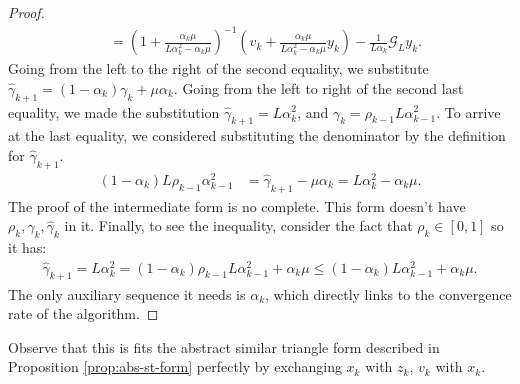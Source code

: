 \documentclass[12pt]{article}
\begin{document}
\begin{proof}
\begin{align*}
                &= 
                \left(
                    1 + \frac{\alpha_k \mu}{L \alpha_k^2 - \alpha_k \mu}
                \right)^{-1}
                \left(
                    v_k + 
                    \frac{\alpha_k \mu}{L \alpha_k^2 - \alpha_k \mu} y_k
                \right)
                - \frac{1}{L\alpha_{k}}\mathcal G_L y_k. 
            \end{align*}
            Going from the left to the right of the second equality, we substitute $\hat \gamma_{k + 1} = (1 - \alpha_k)\gamma_k + \mu\alpha_k$. 
            Going from the left to right of the second last equality, we made the substitution $\hat \gamma_{k + 1} = L \alpha_k^2$, and $\gamma_k = \rho_{k - 1}L \alpha_{k - 1}^2$. 
            To arrive at the last equality, we considered substituting the denominator by the definition for $\hat\gamma_{k + 1}$. 
            \begin{align*}
                (1 - \alpha_k)L\rho_{k - 1}\alpha_{k - 1}^2
                &= 
                \hat \gamma_{k + 1} - \mu \alpha_k
                = 
                L\alpha_{k}^2 - \alpha_k\mu. 
            \end{align*}
            The proof of the intermediate form is no complete. 
            This form doesn't have $\rho_k, \gamma_k, \hat \gamma_k$ in it. 
            Finally, to see the inequality, consider the fact that $\rho_k \in [0, 1]$ so it has: 
            \begin{align*}
                \hat \gamma_{k + 1} = L\alpha_k^2 = (1 - \alpha_k)\rho_{k - 1}L \alpha_{k - 1}^2 + \alpha_k \mu 
                \le (1 - \alpha_k)L \alpha_{k - 1}^2 + \alpha_k \mu. 
            \end{align*}
            The only auxiliary sequence it needs is $\alpha_k$, which directly links to the convergence rate of the algorithm. 
        \end{proof}
        \begin{remark}
            Observe that this is fits the abstract similar triangle form described in Proposition \ref{prop:abs-st-form} perfectly by exchanging $x_k$ with $z_k$, $v_k$ with $x_k$. 
        \end{remark}
\end{document}
